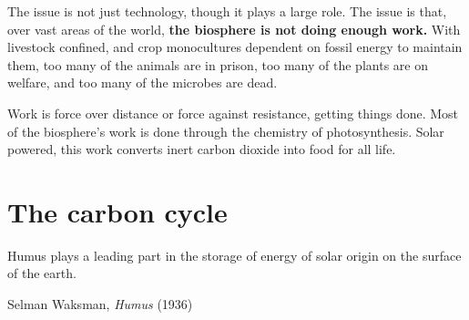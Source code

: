 \documentclass[11pt,letterpaper,oneside,onecolumn]{memoir}
\begin{document}
The issue is not just technology, though it plays a large role. The issue is that, over vast areas of the world, \textbf{the biosphere is not doing enough work.} With livestock confined, and crop monocultures dependent on fossil energy to maintain them, too many of the animals are in prison, too many of the plants are on welfare, and too many of the microbes are dead.

Work is force over distance or force against resistance, getting things done. Most of the biosphere's work is done through the chemistry of photosynthesis. Solar powered, this work converts inert carbon dioxide into food for all life.

\section{The carbon cycle}

\epigraph{Humus plays a leading part in the storage of energy of solar origin on the surface of the earth.}{Selman Waksman, \textit{Humus} (1936)}
\end{document}
